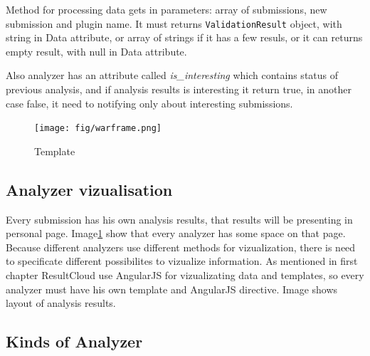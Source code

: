 Method for processing data gets in parameters: array of submissions, new submission and plugin name. It must returns \texttt{ValidationResult} object, with string in Data attribute, or array of strings if it has a few resuls, or it can returns empty result, with null in Data attribute.

Also analyzer has an attribute called \emph{is\_interesting} which contains status of previous analysis, and if analysis results is interesting it return true, in another case false, it need to notifying only about interesting submissions.

\begin{figure}
  \centering
    \texttt{[image: fig/warframe.png]}
  \caption{Template}
  \label{fig:temp}
\end{figure}

\subsection{Analyzer vizualisation}

Every submission has his own analysis results, that results will be presenting in personal page. Image\ref{fig:temp} show that every analyzer has some space on that page. Because different analyzers use different methods for vizualization, there is need to specificate different possibilites to vizualize information. As mentioned in first chapter ResultCloud use AngularJS for vizualizating data and templates, so every analyzer must have his own template and AngularJS  directive. Image shows layout of analysis results.

\subsection{Kinds of Analyzer}

